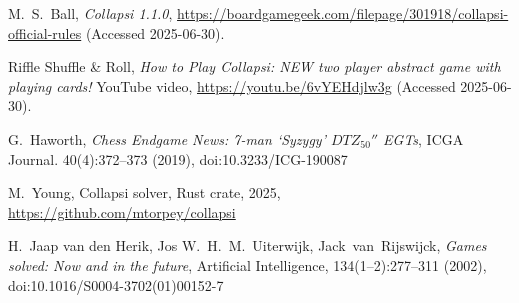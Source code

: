 \documentclass[a4paper, twocolumn]{article}
\begin{document}
\begin{thebibliography}{9}

  M.~S.~Ball,
  \textit{Collapsi 1.1.0},
  \url{https://boardgamegeek.com/filepage/301918/collapsi-official-rules}
  (Accessed 2025-06-30).

  Riffle Shuffle \& Roll,
  \textit{How to Play Collapsi: NEW two player abstract game with playing cards!}
  YouTube video,
  \url{https://youtu.be/6vYEHdjlw3g}
  (Accessed 2025-06-30).

  G.~Haworth,
  \textit{Chess Endgame News: 7-man `Syzygy' $DTZ_{50}''$ EGTs},
  ICGA Journal. 40(4):372--373 (2019),
  doi:10.3233/ICG-190087

  M.~Young,
  Collapsi solver,
  Rust crate,
  2025,
  \url{https://github.com/mtorpey/collapsi}

  H.~Jaap van den Herik, Jos W.~H.~M.~Uiterwijk, Jack~van~Rijswijck,
  \textit{Games solved: Now and in the future},
  Artificial Intelligence, 134(1--2):277--311 (2002),
  doi:10.1016/S0004-3702(01)00152-7

\end{thebibliography}
\end{document}

